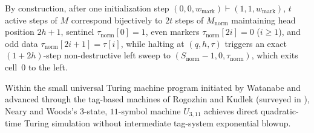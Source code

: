 \documentclass[11pt,reqno]{amsart}
\numberwithin{equation}{section}
\theoremstyle{plain}
\theoremstyle{definition}
\theoremstyle{remark}
\begin{document}
By construction, after one initialization step $(0, 0, w_{\mathrm{mark}}) \vdash (1, 1, w_{\mathrm{mark}})$, $t$ active steps of $M$ correspond bijectively to $2t$ steps of $M_{\mathrm{norm}}$ maintaining head position $2h + 1$, sentinel $\tau_{\mathrm{norm}}[0] = 1$, even markers $\tau_{\mathrm{norm}}[2i] = 0$ ($i \ge 1$), and odd data $\tau_{\mathrm{norm}}[2i+1] = \tau[i]$, while halting at $(q, h, \tau)$ triggers an exact $(1 + 2h)$-step non-destructive left sweep to $(S_{\mathrm{norm}}-1, 0, \tau_{\mathrm{norm}})$, which exits cell~$0$ to the left.

Within the small universal Turing machine program initiated by Watanabe \cite{Watanabe1961UTM} and advanced through the tag-based machines of Rogozhin and Kudlek \cite{Rogozhin1996SmallUTM,Rogozhin1998UTM22x2,KudlekRogozhin2002UTM3x9} (surveyed in \cite{WoodsNeary2009Survey}), Neary and Woods's $3$-state, $11$-symbol machine $U_{3,11}$ \cite{NearyWoods2006SmallFast,Neary2008Thesis} achieves direct quadratic-time Turing simulation without intermediate tag-system exponential blowup.
\end{document}
